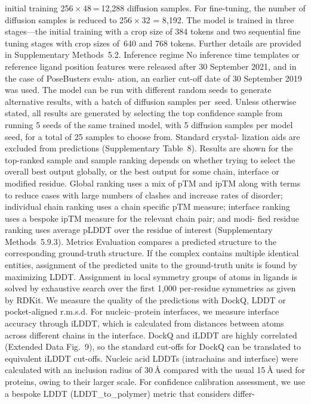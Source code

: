 initial training 256 × 48 = 12,288 diffusion samples. For fine-tuning, the
number of diffusion samples is reduced to 256 × 32 = 8,192. The model is
trained in three stages—the initial training with a crop size of 384 tokens
and two sequential fine tuning stages with crop sizes of 640 and 768
tokens. Further details are provided in Supplementary Methods 5.2.
Inference regime
No inference time templates or reference ligand position features were
released after 30 September 2021, and in the case of PoseBusters evalu-
ation, an earlier cut-off date of 30 September 2019 was used. The model
can be run with different random seeds to generate alternative results,
with a batch of diffusion samples per seed. Unless otherwise stated,
all results are generated by selecting the top confidence sample from
running 5 seeds of the same trained model, with 5 diffusion samples per
model seed, for a total of 25 samples to choose from. Standard crystal-
lization aids are excluded from predictions (Supplementary Table 8).
Results are shown for the top-ranked sample and sample ranking
depends on whether trying to select the overall best output globally,
or the best output for some chain, interface or modified residue. Global
ranking uses a mix of pTM and ipTM along with terms to reduce cases
with large numbers of clashes and increase rates of disorder; individual
chain ranking uses a chain specific pTM measure; interface ranking
uses a bespoke ipTM measure for the relevant chain pair; and modi-
fied residue ranking uses average pLDDT over the residue of interest
(Supplementary Methods 5.9.3).
Metrics
Evaluation compares a predicted structure to the corresponding
ground-truth structure. If the complex contains multiple identical
entities, assignment of the predicted units to the ground-truth units
is found by maximizing LDDT. Assignment in local symmetry groups
of atoms in ligands is solved by exhaustive search over the first 1,000
per-residue symmetries as given by RDKit.
We measure the quality of the predictions with DockQ, LDDT or
pocket-aligned r.m.s.d. For nucleic–protein interfaces, we measure
interface accuracy through iLDDT, which is calculated from distances
between atoms across different chains in the interface. DockQ and
iLDDT are highly correlated (Extended Data Fig. 9), so the standard
cut-offs for DockQ can be translated to equivalent iLDDT cut-offs.
Nucleic acid LDDTs (intrachains and interface) were calculated with an
inclusion radius of 30 Å compared with the usual 15 Å used for proteins,
owing to their larger scale. For confidence calibration assessment, we
use a bespoke LDDT (LDDT\_to\_polymer) metric that considers differ-
